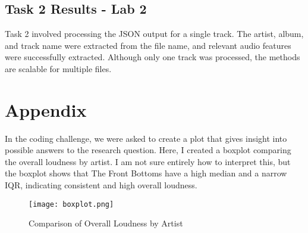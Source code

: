 \documentclass{article}\usepackage[]{graphicx}\usepackage[]{xcolor}
\begin{document}
\begin{multicols}{2}
\subsection{Task 2 Results - Lab 2}
Task 2 involved processing the JSON output for a single track. The artist, album, and track name were extracted from the file name, and relevant audio features were successfully extracted. Although only one track was processed, the methods are scalable for multiple files.

\vspace{2em}

\begin{tiny}

\end{tiny}
\end{multicols}

\newpage
\onecolumn
\section{Appendix}
In the coding challenge, we were asked to create a plot that gives insight into possible answers to the research question. Here, I created a boxplot comparing the overall loudness by artist. I am not sure entirely how to interpret this, but the boxplot shows that The Front Bottoms have a high median and a narrow IQR, indicating consistent and high overall loudness. 

\begin{figure}[h!]
  \centering
  \texttt{[image: boxplot.png]} 
  \caption{Comparison of Overall Loudness by Artist}
  \label{fig:boxplot}
\end{figure}
\end{document}
